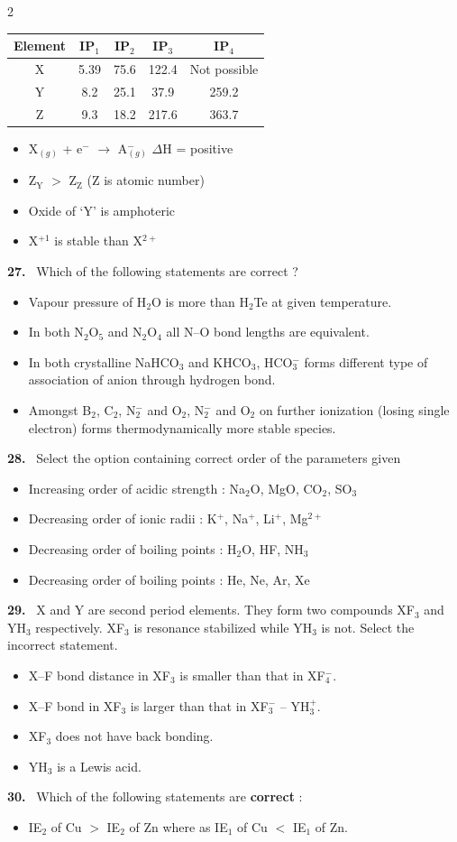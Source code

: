 \documentclass[10pt]{extarticle}
\newcommand{\qn}[1]{\par\smallskip\noindent\textbf{#1.}~}
\newenvironment{qoptions}{\begin{itemize}[leftmargin=1.8em,itemsep=1pt,topsep=2pt,label={}]}{\end{itemize}}
\newcommand{\opt}[2]{\item[(#1)] #2}
\begin{document}
\begin{multicols}{2}
\begin{tabular}{|c|c|c|c|c|}\hline
Element & IP$_1$ & IP$_2$ & IP$_3$ & IP$_4$\\\hline
X & 5.39 & 75.6 & 122.4 & Not possible\\\hline
Y & 8.2 & 25.1 & 37.9 & 259.2\\\hline
Z & 9.3 & 18.2 & 217.6 & 363.7\\\hline
\end{tabular}\par
\begin{qoptions}
\opt{A}{X$_{(g)}$ + e$^-$ $\longrightarrow$ A$^-_{(g)}$ \quad $\Delta$H = positive}
\opt{B}{Z$_\mathrm Y$ $>$ Z$_\mathrm Z$ (Z is atomic number)}
\opt{C}{Oxide of `Y' is amphoteric}
\opt{D}{X$^{+1}$ is stable than X$^{2+}$}
\end{qoptions}
\qn{27} Which of the following statements are correct ?
\begin{qoptions}
\opt{A}{Vapour pressure of H$_2$O is more than H$_2$Te at given temperature.}
\opt{B}{In both N$_2$O$_5$ and N$_2$O$_4$ all N--O bond lengths are equivalent.}
\opt{C}{In both crystalline NaHCO$_3$ and KHCO$_3$, HCO$_3^-$ forms different type of association of anion through hydrogen bond.}
\opt{D}{Amongst B$_2$, C$_2$, N$_2^-$ and O$_2$, N$_2^-$ and O$_2$ on further ionization (losing single electron) forms thermodynamically more stable species.}
\end{qoptions}
\qn{28} Select the option containing correct order of the parameters given
\begin{qoptions}
\opt{A}{Increasing order of acidic strength : Na$_2$O, MgO, CO$_2$, SO$_3$}
\opt{B}{Decreasing order of ionic radii : K$^+$, Na$^+$, Li$^+$, Mg$^{2+}$}
\opt{C}{Decreasing order of boiling points : H$_2$O, HF, NH$_3$}
\opt{D}{Decreasing order of boiling points : He, Ne, Ar, Xe}
\end{qoptions}
\qn{29} X and Y are second period elements. They form two compounds XF$_3$ and YH$_3$ respectively. XF$_3$ is resonance stabilized while YH$_3$ is not. Select the incorrect statement.
\begin{qoptions}
\opt{A}{X--F bond distance in XF$_3$ is smaller than that in XF$_4^-$.}
\opt{B}{X--F bond in XF$_3$ is larger than that in XF$_3^-$ -- YH$_3^+$.}
\opt{C}{XF$_3$ does not have back bonding.}
\opt{D}{YH$_3$ is a Lewis acid.}
\end{qoptions}
\qn{30} Which of the following statements are \textbf{correct} :
\begin{qoptions}
\opt{A}{IE$_2$ of Cu $>$ IE$_2$ of Zn where as IE$_1$ of Cu $<$ IE$_1$ of Zn.}

\end{qoptions}
\end{multicols}
\end{document}
